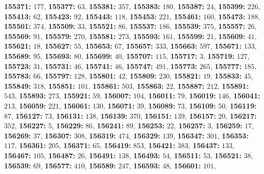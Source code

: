 \textsf{\bfseries 155371:} $177$, \textsf{\bfseries 155377:} $63$, \textsf{\bfseries 155381:} $357$, \textsf{\bfseries 155383:} $180$, \textsf{\bfseries 155387:} $24$, \textsf{\bfseries 155399:} $226$, \textsf{\bfseries 155413:} $62$, \textsf{\bfseries 155423:} $92$, \textsf{\bfseries 155443:} $118$, \textsf{\bfseries 155453:} $221$, \textsf{\bfseries 155461:} $160$, \textsf{\bfseries 155473:} $188$, \textsf{\bfseries 155501:} $374$, \textsf{\bfseries 155509:} $33$, \textsf{\bfseries 155521:} $86$, \textsf{\bfseries 155537:} $186$, \textsf{\bfseries 155539:} $375$, \textsf{\bfseries 155557:} $26$, \textsf{\bfseries 155569:} $91$, \textsf{\bfseries 155579:} $270$, \textsf{\bfseries 155581:} $273$, \textsf{\bfseries 155593:} $161$, \textsf{\bfseries 155599:} $21$, \textsf{\bfseries 155609:} $41$, \textsf{\bfseries 155621:} $18$, \textsf{\bfseries 155627:} $55$, \textsf{\bfseries 155653:} $67$, \textsf{\bfseries 155657:} $333$, \textsf{\bfseries 155663:} $597$, \textsf{\bfseries 155671:} $133$, \textsf{\bfseries 155689:} $95$, \textsf{\bfseries 155693:} $80$, \textsf{\bfseries 155699:} $40$, \textsf{\bfseries 155707:} $115$, \textsf{\bfseries 155717:} $3$, \textsf{\bfseries 155719:} $127$, \textsf{\bfseries 155723:} $31$, \textsf{\bfseries 155731:} $46$, \textsf{\bfseries 155741:} $46$, \textsf{\bfseries 155747:} $491$, \textsf{\bfseries 155773:} $265$, \textsf{\bfseries 155777:} $185$, \textsf{\bfseries 155783:} $66$, \textsf{\bfseries 155797:} $128$, \textsf{\bfseries 155801:} $42$, \textsf{\bfseries 155809:} $230$, \textsf{\bfseries 155821:} $19$, \textsf{\bfseries 155833:} $45$, \textsf{\bfseries 155849:} $318$, \textsf{\bfseries 155851:} $101$, \textsf{\bfseries 155861:} $503$, \textsf{\bfseries 155863:} $22$, \textsf{\bfseries 155887:} $212$, \textsf{\bfseries 155891:} $543$, \textsf{\bfseries 155893:} $273$, \textsf{\bfseries 155921:} $59$, \textsf{\bfseries 156007:} $104$, \textsf{\bfseries 156011:} $79$, \textsf{\bfseries 156019:} $146$, \textsf{\bfseries 156041:} $213$, \textsf{\bfseries 156059:} $221$, \textsf{\bfseries 156061:} $130$, \textsf{\bfseries 156071:} $39$, \textsf{\bfseries 156089:} $73$, \textsf{\bfseries 156109:} $50$, \textsf{\bfseries 156119:} $87$, \textsf{\bfseries 156127:} $73$, \textsf{\bfseries 156131:} $138$, \textsf{\bfseries 156139:} $370$, \textsf{\bfseries 156151:} $139$, \textsf{\bfseries 156157:} $20$, \textsf{\bfseries 156217:} $352$, \textsf{\bfseries 156227:} $5$, \textsf{\bfseries 156229:} $86$, \textsf{\bfseries 156241:} $89$, \textsf{\bfseries 156253:} $22$, \textsf{\bfseries 156257:} $3$, \textsf{\bfseries 156259:} $17$, \textsf{\bfseries 156269:} $37$, \textsf{\bfseries 156307:} $308$, \textsf{\bfseries 156319:} $474$, \textsf{\bfseries 156329:} $139$, \textsf{\bfseries 156347:} $301$, \textsf{\bfseries 156353:} $117$, \textsf{\bfseries 156361:} $205$, \textsf{\bfseries 156371:} $65$, \textsf{\bfseries 156419:} $853$, \textsf{\bfseries 156421:} $383$, \textsf{\bfseries 156437:} $133$, \textsf{\bfseries 156467:} $105$, \textsf{\bfseries 156487:} $26$, \textsf{\bfseries 156491:} $138$, \textsf{\bfseries 156493:} $54$, \textsf{\bfseries 156511:} $53$, \textsf{\bfseries 156521:} $38$, \textsf{\bfseries 156539:} $69$, \textsf{\bfseries 156577:} $410$, \textsf{\bfseries 156589:} $247$, \textsf{\bfseries 156593:} $48$, \textsf{\bfseries 156601:} $101$, 
